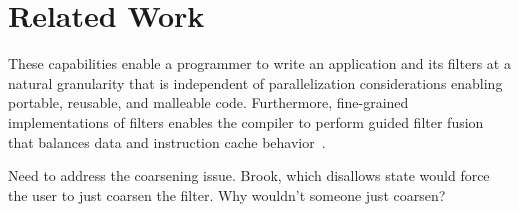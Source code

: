 \section{Related Work}
\label{sec:related}

These capabilities enable a programmer to write an application and its
filters at a natural granularity that is independent of
parallelization considerations enabling portable, reusable, and
malleable code.  Furthermore, fine-grained implementations of filters
enables the compiler to perform guided filter fusion that balances
data and instruction cache behavior~\cite{sermulins-lctes05}.


Need to address the coarsening issue.  Brook, which disallows state
would force the user to just coarsen the filter.  Why wouldn't someone
just coarsen?  

